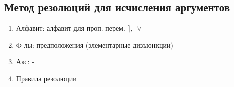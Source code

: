 \documentclass[main]{subfiles}
\begin{document}
    \subsection{Метод резолюций для исчисления аргументов}

    \begin{enumerate}
        \item Алфавит: алфавит для проп. перем. $\rceil,\ \vee$
        \item Ф-лы: предположения (элементарные дизъюнкции)
        \item Акс: -
        \item Правила резолюции

    \end{enumerate}
\end{document}
